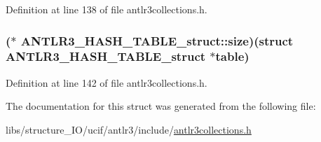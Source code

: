 Definition at line 138 of file antlr3collections.\-h.

\hypertarget{struct_a_n_t_l_r3___h_a_s_h___t_a_b_l_e__struct_a62af9925961c7ffef5fdb3773405f67f}{
\subsubsection[{size}]{($\ast$ A\-N\-T\-L\-R3\-\_\-\-H\-A\-S\-H\-\_\-\-T\-A\-B\-L\-E\-\_\-struct\-::size)(struct {\bf A\-N\-T\-L\-R3\-\_\-\-H\-A\-S\-H\-\_\-\-T\-A\-B\-L\-E\-\_\-struct} $\ast$table)}}\label{struct_a_n_t_l_r3___h_a_s_h___t_a_b_l_e__struct_a62af9925961c7ffef5fdb3773405f67f}


Definition at line 142 of file antlr3collections.\-h.



The documentation for this struct was generated from the following file\-:\begin{DoxyCompactItemize}
\item 
libs/structure\-\_\-\-I\-O/ucif/antlr3/include/\hyperlink{antlr3collections_8h}{antlr3collections.\-h}\end{DoxyCompactItemize}
